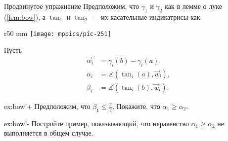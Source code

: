 \begin{thm}{Продвинутое упражнение}\label{ex:bow'}
Предположим, что $\gamma_1$ и $\gamma_2$ как в лемме о луке (\ref{lem:bow}),
а  $\tan_1$ и $\tan_2$ --- их касательные индикатрисы как.

{

\begin{wrapfigure}{r}{50 mm}
\vskip-0mm
\centering
\texttt{[image: mppics/pic-251]}
\vskip-4mm
\end{wrapfigure}

Пусть 
\begin{align*}
\vec w_i&=\gamma_i(b)-\gamma_i(a),
\\
\alpha_i&=\measuredangle(\tan_i(a),\vec w_i),
\\
\beta_i&=\measuredangle(\tan_i(b),\vec w_i).
\end{align*}

}

\begin{subthm}{ex:bow'+}
Предположим, что $\beta_1\le\tfrac\pi2$.
Покажите, что $\alpha_1\ge \alpha_2$.
\end{subthm}

\begin{subthm}{ex:bow'-} Постройте пример, показывающий, что неравенство $\alpha_1\ge \alpha_2$ не выполняется в общем случае.
\end{subthm}

\end{thm}

\pagebreak

